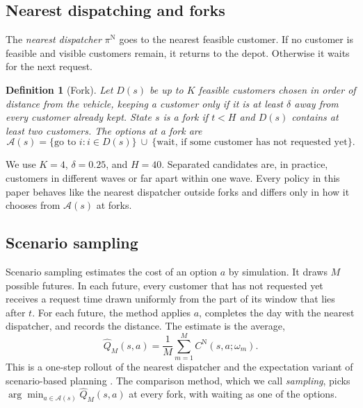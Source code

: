 \documentclass[5p,times,authoryear]{elsarticle}
\newtheorem{definition}{Definition}
\begin{document}
\subsection{Nearest dispatching and forks}

The \emph{nearest dispatcher} $\pi^{\mathrm{N}}$ goes to the nearest feasible customer. If no customer is feasible and visible customers remain, it returns to the depot. Otherwise it waits for the next request.

\begin{definition}[Fork]
Let $D(s)$ be up to $K$ feasible customers chosen in order of distance from the vehicle, keeping a customer only if it is at least $\delta$ away from every customer already kept. State $s$ is a \emph{fork} if $t<H$ and $D(s)$ contains at least two customers. The options at a fork are
\begin{equation}
\mathcal{A}(s)=\{\text{go to } i: i\in D(s)\}\ \cup\ \{\text{wait, if some customer has not requested yet}\}.
\label{eq:forkactions}
\end{equation}
\end{definition}

We use $K=4$, $\delta=0.25$, and $H=40$. Separated candidates are, in practice, customers in different waves or far apart within one wave. Every policy in this paper behaves like the nearest dispatcher outside forks and differs only in how it chooses from $\mathcal{A}(s)$ at forks.

\subsection{Scenario sampling}

Scenario sampling estimates the cost of an option $a$ by simulation. It draws $M$ possible futures. In each future, every customer that has not requested yet receives a request time drawn uniformly from the part of its window that lies after $t$. For each future, the method applies $a$, completes the day with the nearest dispatcher, and records the distance. The estimate is the average,
\begin{equation}
\widehat{Q}_M(s,a)=\frac{1}{M}\sum_{m=1}^{M}C^{\mathrm{N}}(s,a;\omega_m).
\label{eq:qhat}
\end{equation}
This is a one-step rollout of the nearest dispatcher \citep{bertsekas1997rollout} and the expectation variant of scenario-based planning \citep{vanhentenryck2006online}. The comparison method, which we call \emph{sampling}, picks $\arg\min_{a\in\mathcal{A}(s)}\widehat{Q}_M(s,a)$ at every fork, with waiting as one of the options.
\end{document}

